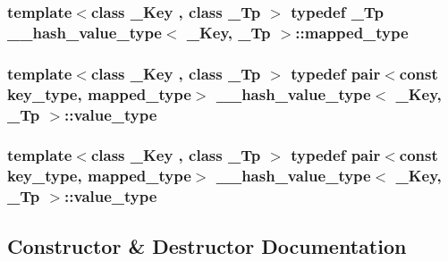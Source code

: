 \subsubsection[{mapped\+\_\+type}]{\setlength{\rightskip}{0pt plus 5cm}template$<$class \+\_\+\+Key , class \+\_\+\+Tp $>$ typedef \+\_\+\+Tp {\bf \+\_\+\+\_\+hash\+\_\+value\+\_\+type}$<$ \+\_\+\+Key, \+\_\+\+Tp $>$\+::{\bf mapped\+\_\+type}}\label{struct____hash__value__type_a8e898527f944f8e069527adfd8cd838d}
\hypertarget{struct____hash__value__type_ac11e71883806eb3d03807b7f284b4a70}{}
\subsubsection[{value\+\_\+type}]{\setlength{\rightskip}{0pt plus 5cm}template$<$class \+\_\+\+Key , class \+\_\+\+Tp $>$ typedef pair$<$const {\bf key\+\_\+type}, {\bf mapped\+\_\+type}$>$ {\bf \+\_\+\+\_\+hash\+\_\+value\+\_\+type}$<$ \+\_\+\+Key, \+\_\+\+Tp $>$\+::{\bf value\+\_\+type}}\label{struct____hash__value__type_ac11e71883806eb3d03807b7f284b4a70}
\hypertarget{struct____hash__value__type_ac11e71883806eb3d03807b7f284b4a70}{}
\subsubsection[{value\+\_\+type}]{\setlength{\rightskip}{0pt plus 5cm}template$<$class \+\_\+\+Key , class \+\_\+\+Tp $>$ typedef pair$<$const {\bf key\+\_\+type}, {\bf mapped\+\_\+type}$>$ {\bf \+\_\+\+\_\+hash\+\_\+value\+\_\+type}$<$ \+\_\+\+Key, \+\_\+\+Tp $>$\+::{\bf value\+\_\+type}}\label{struct____hash__value__type_ac11e71883806eb3d03807b7f284b4a70}


\subsection{Constructor \& Destructor Documentation}
\hypertarget{struct____hash__value__type_a0ebe048baf8f52f962fb88ac7f7278ca}{}
